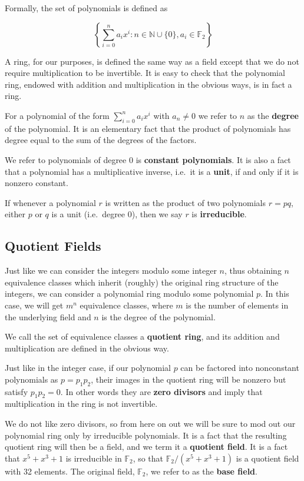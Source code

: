 \documentclass[letterpaper]{article}
\newcommand{\ftwo}{\mathbb{F}_2}
\begin{document}
Formally, the set of polynomials is defined as

\[ \left\{ \sum_{i=0}^n a_{i}x^i : n\in\mathbb{N}\cup\{0\}, a_i\in \ftwo  \right\} \]

A ring, for our purposes, is defined the same way as a field except that we do
not require multiplication to be invertible. It is easy to check that the
polynomial ring, endowed with addition and multiplication in the obvious ways,
is in fact a ring.

For a polynomial of the form $\sum_{i=0}^n a_{i}x^i$ with $a_n\neq0$ we refer to $n$ as the
\textbf{degree} of the polynomial. It is an elementary fact that the product
of polynomials has degree equal to the sum of the degrees of the factors.

We refer to polynomials of degree 0 is \textbf{constant polynomials}. It is
also a fact that a polynomial has a multiplicative inverse, i.e.~it is a
\textbf{unit}, if and only if it is nonzero constant.

If whenever a polynomial $r$ is written as the product of two polynomials $r=pq$,
either $p$ or $q$ is a unit (i.e.~degree 0), then we say $r$ is \textbf{irreducible}.

\subsection{Quotient Fields}

Just like we can consider the integers modulo some integer $n$, thus obtaining
$n$ equivalence classes which inherit (roughly) the original ring structure of
the integers, we can consider a polynomial ring modulo some polynomial $p$. In
this case, we will get $m^n$ equivalence classes, where $m$ is the number of
elements in the underlying field and $n$ is the degree of the polynomial.

We call the set of equivalence classes a \textbf{quotient ring}, and its addition
and multiplication are defined in the obvious way.

Just like in the integer case, if our polynomial $p$ can be factored into
nonconstant polynomials as $p=p_1p_2$, their images in the quotient ring will
be nonzero but satisfy $p_1p_2 = 0$. In other words they are \textbf{zero
divisors} and imply that multiplication in the ring is not invertible.

We do not like zero divisors, so from here on out we will be sure to mod out
our polynomial ring only by irreducible polynomials. It is a fact that the
resulting quotient ring will then be a field, and we term it a \textbf{quotient
field}. It is a fact that $x^5 + x^3 + 1$ is irreducible in $\ftwo$, so that
$\ftwo/(x^5 + x^3 + 1)$ is a quotient field with 32 elements. The original
field, $\ftwo$, we refer to as the \textbf{base field}.
\end{document}
